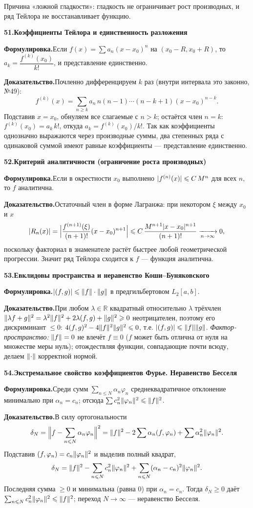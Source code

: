 \documentclass[10pt,a4paper]{article}
\newcommand{\R}{\mathbb{R}}
\renewcommand{\le}{\leqslant}
\renewcommand{\ge}{\geqslant}
\DeclarePairedDelimiter{\abs}{\lvert}{\rvert}
\DeclarePairedDelimiter{\norm}{\lVert}{\rVert}
\theoremstyle{definition}
\theoremstyle{plain}
\newcommand{\writespace}{\vspace{7.5mm}}
\newcommand{\prf}[2]{%
  \par\writespace\noindent
  {\large\bfseries\color{accent}#1.\enspace #2}\par\smallskip}
\newcommand{\stmt}{\par\noindent\textbf{Формулировка.}\enspace}
\newcommand{\dok}{\par\noindent\textbf{Доказательство.}\enspace}
\begin{document}
Причина «ложной гладкости»: гладкость не ограничивает рост производных, и ряд Тейлора не
восстанавливает функцию.

\prf{51}{Коэффициенты Тейлора и единственность разложения}
\stmt Если $f(x)=\sum a_n(x-x_0)^n$ на $(x_0-R,x_0+R)$, то $a_k=\dfrac{f^{(k)}(x_0)}{k!}$, и
представление единственно.

\dok Почленно дифференцируем $k$ раз (внутри интервала это законно, №49):
\[
  f^{(k)}(x)=\sum_{n\ge k}a_n\,n(n-1)\cdots(n-k+1)(x-x_0)^{n-k}.
\]
Подставив $x=x_0$, обнуляем все слагаемые с $n>k$; остаётся член $n=k$: $f^{(k)}(x_0)=a_k\,k!$,
откуда $a_k=f^{(k)}(x_0)/k!$. Так как коэффициенты однозначно выражаются через производные суммы,
два степенных ряда с одинаковой суммой имеют равные коэффициенты — представление единственно.

\prf{52}{Критерий аналитичности (ограничение роста производных)}
\stmt Если в окрестности $x_0$ выполнено $\abs{f^{(n)}(x)}\le C\,M^n$ для всех $n$, то $f$
аналитична.

\dok Остаточный член в форме Лагранжа: при некотором $\xi$ между $x_0$ и $x$
\[
  \abs{R_n(x)}=\abs[\Big]{\frac{f^{(n+1)}(\xi)}{(n+1)!}(x-x_0)^{n+1}}
  \le C\,\frac{M^{n+1}\abs{x-x_0}^{n+1}}{(n+1)!}\xrightarrow[n\to\infty]{}0,
\]
поскольку факториал в знаменателе растёт быстрее любой геометрической прогрессии. Значит ряд Тейлора
сходится к $f$ — функция аналитична.

\prf{53}{Евклидовы пространства и неравенство Коши–Буняковского}
\stmt $\abs{(f,g)}\le\norm f\cdot\norm g$ в предгильбертовом $L_2[a,b]$.

\dok При любом $\lambda\in\R$ квадратный относительно $\lambda$ трёхчлен
$\norm{\lambda f+g}^2=\lambda^2\norm f^2+2\lambda(f,g)+\norm g^2\ge0$ неотрицателен, поэтому его
дискриминант $\le0$: $4(f,g)^2-4\norm f^2\norm g^2\le0$, т.е. $\abs{(f,g)}\le\norm f\norm g$.
\emph{Фактор-пространство:} $\norm f=0$ не влечёт $f\equiv0$ ($f$ может быть отлична от нуля на
множестве меры нуль); отождествляя функции, совпадающие почти всюду, делаем $\norm{\cdot}$
корректной нормой.

\prf{54}{Экстремальное свойство коэффициентов Фурье. Неравенство Бесселя}
\stmt Среди сумм $\sum_{n\le N}\alpha_n\varphi_n$ среднеквадратичное отклонение минимально при
$\alpha_n=c_n$; отсюда $\sum c_n^2\norm{\varphi_n}^2\le\norm f^2$.

\dok В силу ортогональности
\[
  \delta_N=\norm[\Big]{f-\sum_{n\le N}\alpha_n\varphi_n}^2
  =\norm f^2-2\sum\alpha_n(f,\varphi_n)+\sum\alpha_n^2\norm{\varphi_n}^2 .
\]
Подставив $(f,\varphi_n)=c_n\norm{\varphi_n}^2$ и выделив полный квадрат,
\[
  \delta_N=\norm f^2-\sum_{n\le N}c_n^2\norm{\varphi_n}^2+\sum_{n\le N}(\alpha_n-c_n)^2\norm{\varphi_n}^2 .
\]
Последняя сумма $\ge0$ и минимальна (равна $0$) при $\alpha_n=c_n$. Тогда $\delta_N\ge0$ даёт
$\sum_{n\le N}c_n^2\norm{\varphi_n}^2\le\norm f^2$; переход $N\to\infty$ — неравенство Бесселя.
\end{document}
